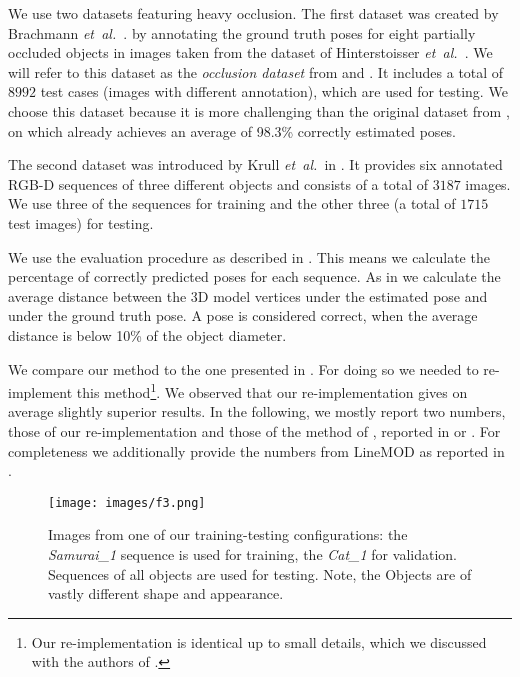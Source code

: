 \documentclass[10pt,letterpaper]{article}
\newcommand{\etal}{\mbox{\emph{et al.\ }}}
\begin{document}
 We use two datasets featuring heavy occlusion. The first dataset was created by Brachmann \etal. \cite{brachmann2014} by annotating the ground truth poses for eight partially occluded objects in images taken from the dataset of Hinterstoisser \etal \cite{hinterstoisser2012accv}. We will refer to this dataset as the \emph{occlusion dataset} from \cite{brachmann2014} and \cite{hinterstoisser2012accv}. It includes a total of $8992$ test cases (images with different annotation), which are used for testing. We choose this dataset because it is more challenging than the original dataset from \cite{hinterstoisser2012accv}, on which  \cite{brachmann2014} already achieves an average of 98.3\% correctly estimated poses.

The second dataset was introduced by Krull \etal in \cite{krull2014}.
It provides six annotated RGB-D sequences of three different objects and consists of a total of $3187$ images. We use three of the sequences for training and the other three (a total of $1715$ test images) for testing.

 We use the evaluation procedure as described in \cite{brachmann2014}. This means we calculate the percentage of correctly predicted poses for each sequence. As in \cite{hinterstoisser2012accv} we calculate the average distance between the 3D model vertices under the estimated pose and under the ground truth pose. A pose is considered correct, when the average distance is below 10\% of the object diameter.

 We compare our method to the one presented in \cite{brachmann2014}. For doing so we needed to re-implement this method\footnote{Our re-implementation is identical up to small details, which we discussed with the authors of \cite{brachmann2014}.}.  We observed that our re-implementation gives on average slightly superior results. In the following, we mostly report two numbers, those of our re-implementation and those of the method of \cite{brachmann2014}, reported in \cite{brachmann2014} or \cite{krull2014}. For completeness we additionally provide the numbers from LineMOD \cite{hinterstoisser2012accv} as reported in \cite{brachmann2014}.



\begin{figure}[!ht]
\begin{center}
\texttt{[image: images/f3.png]}
\end{center}
   \caption{Images from one of our training-testing configurations: the \emph{Samurai\_1} sequence is used for training,  the \emph{Cat\_1} for validation. Sequences of all objects are used for testing. Note, the Objects are of vastly different shape and appearance.}
\label{fig:trainValidateTest}
\end{figure}
\end{document}
